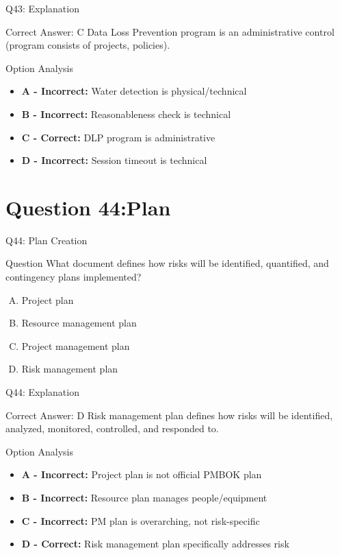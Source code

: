 \documentclass{beamer}
\begin{document}
	\begin{frame}{Q43: Explanation}
		\begin{block}{Correct Answer: C}
			Data Loss Prevention program is an administrative control (program consists of projects, policies).
		\end{block}
		\begin{block}{Option Analysis}
			\begin{itemize}
				\item \textbf{A - Incorrect:} Water detection is physical/technical
				\item \textbf{B - Incorrect:} Reasonableness check is technical
				\item \textbf{C - Correct:} DLP program is administrative
				\item \textbf{D - Incorrect:} Session timeout is technical
			\end{itemize}
		\end{block}
	\end{frame}
	
	\section{Question 44:Plan}
	
	\begin{frame}{Q44: Plan Creation}
		\begin{block}{Question}
			What document defines how risks will be identified, quantified, and contingency plans implemented?
		\end{block}
		\begin{enumerate}[(A)]
			\item Project plan
			\item Resource management plan
			\item Project management plan
			\item Risk management plan
		\end{enumerate}
	\end{frame}
	
	\begin{frame}{Q44: Explanation}
		\begin{block}{Correct Answer: D}
			Risk management plan defines how risks will be identified, analyzed, monitored, controlled, and responded to.
		\end{block}
		\begin{block}{Option Analysis}
			\begin{itemize}
				\item \textbf{A - Incorrect:} Project plan is not official PMBOK plan
				\item \textbf{B - Incorrect:} Resource plan manages people/equipment
				\item \textbf{C - Incorrect:} PM plan is overarching, not risk-specific
				\item \textbf{D - Correct:} Risk management plan specifically addresses risk
			\end{itemize}
		\end{block}
	\end{frame}
	
\end{document}
